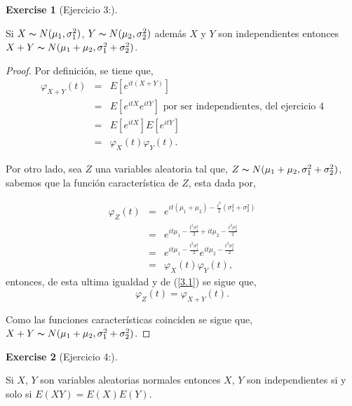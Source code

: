 \documentclass[
  letterpaper,
  DIV=11,
  numbers=noendperiod]{scrreprt}
\theoremstyle{definition}
\newtheorem{exercise}{Exercise}[chapter]
\theoremstyle{plain}
\theoremstyle{remark}
\begin{document}
\begin{exercise}[Ejercicio 3:]\protect\hypertarget{exr-3}{}\label{exr-3}

Si \(X\thicksim N(\mu_{1},\sigma_{1}^{2})\),
\(Y\thicksim N(\mu_{2},\sigma_{2}^{2})\) además \(X\) y \(Y\) son
independientes entonces
\(X+Y\thicksim N(\mu_{1}+\mu_{2},\sigma_{1}^{2}+\sigma_{2}^{2})\).

\end{exercise}

\begin{proof}

Por definición, se tiene que, \begin{eqnarray}\label{3.1}
\varphi_{X+Y}(t) & = & E[e^{it(X+Y)}]\nonumber\\
& = & E[e^{itX}e^{itY}]\text{ por ser independientes, del ejercicio 4}\nonumber\\
& = & E[e^{itX}]E[e^{itY}]\nonumber\\
& = &  \varphi_{X}(t) \varphi_{Y}(t).
\end{eqnarray}

Por otro lado, sea \(Z\) una variables aleatoria tal que,
\(Z\thicksim N(\mu_{1}+\mu_{2},\sigma_{1}^{2}+\sigma_{2}^{2})\), sabemos
que la función característica de \(Z\), esta dada por,

\begin{eqnarray*}
\varphi_{Z}(t) & = & e^{it(\mu_{1}+\mu_{2})-\frac{t^{2}}{2}(\sigma_{1}^{2}+\sigma_{2}^{2})}\nonumber\\
& = & e^{it\mu_{1}-\frac{t^{2}\sigma_{1}^{2}}{2}+it\mu_{2}-\frac{t^{2}\sigma_{2}^{2}}{2}}\nonumber\\
& = & e^{it\mu_{1}-\frac{t^{2}\sigma_{1}^{2}}{2}}e^{it\mu_{2}-\frac{t^{2}\sigma_{2}^{2}}{2}}\\
& = &  \varphi_{X}(t) \varphi_{Y}(t),
\end{eqnarray*} entonces, de esta ultima igualdad y de (\ref{3.1}) se
sigue que, \[
\varphi_{Z}(t)= \varphi_{X+Y}(t).
\]

Como las funciones características coinciden se sigue que,
\(X+Y\thicksim N(\mu_{1}+\mu_{2},\sigma_{1}^{2}+\sigma_{2}^{2})\).

\end{proof}

\begin{exercise}[Ejercicio 4:]\protect\hypertarget{exr-4}{}\label{exr-4}

Si \(X\), \(Y\) son variables aleatorias normales entonces \(X\), \(Y\)
son independientes si y solo si \(E(XY)=E(X)E(Y)\).

\end{exercise}
\end{document}
